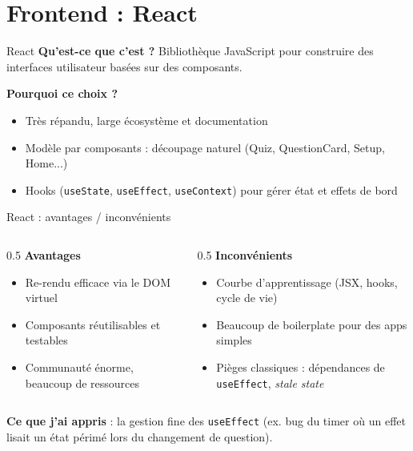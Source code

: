 \documentclass[aspectratio=169]{beamer}
\begin{document}
\section{Frontend : React}

\begin{frame}{React}
  \textbf{Qu'est-ce que c'est ?} Bibliothèque JavaScript pour construire des interfaces utilisateur basées sur des composants.

  \vspace{0.3cm}
  \textbf{Pourquoi ce choix ?}
  \begin{itemize}
    \item Très répandu, large écosystème et documentation
    \item Modèle par composants : découpage naturel (Quiz, QuestionCard, Setup, Home...)
    \item Hooks (\texttt{useState}, \texttt{useEffect}, \texttt{useContext}) pour gérer état et effets de bord
  \end{itemize}
\end{frame}

\begin{frame}{React : avantages / inconvénients}
  \begin{columns}
    \begin{column}{0.5\textwidth}
      \textbf{Avantages}
      \begin{itemize}
        \item Re-rendu efficace via le DOM virtuel
        \item Composants réutilisables et testables
        \item Communauté énorme, beaucoup de ressources
      \end{itemize}
    \end{column}
    \begin{column}{0.5\textwidth}
      \textbf{Inconvénients}
      \begin{itemize}
        \item Courbe d'apprentissage (JSX, hooks, cycle de vie)
        \item Beaucoup de \og boilerplate \fg{} pour des apps simples
        \item Pièges classiques : dépendances de \texttt{useEffect}, \textit{stale state}
      \end{itemize}
    \end{column}
  \end{columns}

  \vspace{0.3cm}
  \textbf{Ce que j'ai appris} : la gestion fine des \texttt{useEffect} (ex. bug du timer où un effet lisait un état \og périmé \fg{} lors du changement de question).
\end{frame}
\end{document}

